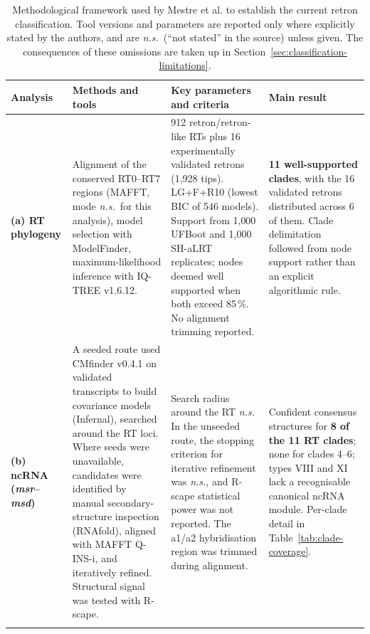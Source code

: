  
\begin{table}[H]
\centering
\scriptsize
\setlength{\tabcolsep}{4pt}
\renewcommand{\arraystretch}{1.25}
\begin{threeparttable}
\caption[Methodological framework of Rodríguez Mestre et al.]{Methodological framework used by Mestre et al.
\cite{mestre2020} to establish the current retron classification. Tool versions and parameters
are reported only where explicitly stated by the authors, and are \textit{n.s.}\ (``not stated''
in the source) unless given. The consequences of these omissions are taken up in
Section~\ref{sec:classification-limitations}.}
\label{tab:mestre-methodology}
\begin{tabularx}{\textwidth}{
    >{\raggedright\arraybackslash}p{}
    >{\raggedright\arraybackslash}p{}
    >{\raggedright\arraybackslash}p{}
    >{\raggedright\arraybackslash}X}
\toprule
\textbf{Analysis} & \textbf{Methods and tools} & \textbf{Key parameters and criteria} &
\textbf{Main result} \\
\midrule
 
\textbf{(a) RT phylogeny} &
Alignment of the conserved RT0--RT7 regions (MAFFT, mode \textit{n.s.}\ for this analysis), model
selection with ModelFinder, maximum-likelihood inference with IQ-TREE v1.6.12.\tnote{a} &
1{,}912 retron/retron-like RTs plus 16 experimentally validated retrons (1{,}928 tips). LG+F+R10
(lowest BIC of 546 models). Support from 1{,}000 UFBoot and 1{,}000 SH-aLRT replicates; nodes
deemed well supported when both exceed 85\,\%. No alignment trimming reported. &
\textbf{11 well-supported clades}, with the 16 validated retrons distributed across 6 of them.
Clade delimitation followed from node support rather than an explicit algorithmic rule. \\
\addlinespace
 
\textbf{(b) ncRNA (\textit{msr}--\textit{msd})} &
A seeded route used CMfinder v0.4.1 on validated transcripts to build covariance models
(Infernal), searched around the RT loci. Where seeds were unavailable, candidates were identified
by manual secondary-structure inspection (RNAfold), aligned with MAFFT Q-INS-i, and iteratively
refined. Structural signal was tested with R-scape. &
Search radius around the RT \textit{n.s.} In the unseeded route, the stopping criterion for
iterative refinement was \textit{n.s.}, and R-scape statistical power was not reported. The a1/a2
hybridisation region was trimmed during alignment. &
Confident consensus structures for \textbf{8 of the 11 RT clades}; none for clades 4--6; types
VIII and XI lack a recognisable canonical ncRNA module. Per-clade detail in
Table~\ref{tab:clade-coverage}. \\
\addlinespace
 

\end{tabularx}
\end{threeparttable}
\end{table}
